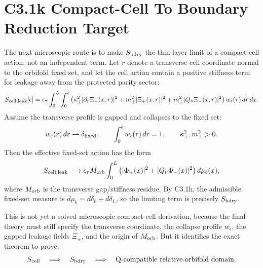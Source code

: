 \documentclass[11pt]{article}
\begin{document}
\section{C3.1k Compact-Cell To Boundary Reduction Target}
The next microscopic route is to make $S_{\rm bdry}$ the thin-layer limit of
a compact-cell action, not an independent term.  Let $r$ denote a transverse
cell coordinate normal to the orbifold fixed set, and let the cell action contain
a positive stiffness term for leakage away from the protected parity sector:
\begin{equation}
S_{\rm cell,leak}[\epsilon]
=
\epsilon_\tau
\int_0^L\int_0^\epsilon
\left(
\kappa_\perp^2|\partial_r\Xi_+(x,r)|^2
+m_\perp^2|\Xi_+(x,r)|^2
+m_\perp^2|Q_\nu\Xi_-(x,r)|^2
\right)
w_\epsilon(r)\,dr\,dx .
\end{equation}
Assume the transverse profile is gapped and collapses to the fixed set:
\begin{equation}
w_\epsilon(r)\,dr\rightharpoonup \delta_{\rm fixed},
\qquad
\int_0^\epsilon w_\epsilon(r)\,dr=1,
\qquad
\kappa_\perp^2,m_\perp^2>0 .
\end{equation}
Then the effective fixed-set action has the form
\begin{equation}
S_{\rm cell,leak}
\longrightarrow
\epsilon_\tau M_{\rm orb}
\int_0^L
\left(|\Phi_+(x)|^2+|Q_\nu\Phi_-(x)|^2\right)d\mu_b(x),
\end{equation}
where $M_{\rm orb}$ is the transverse gap/stiffness residue.  By C3.1h, the
admissible fixed-set measure is $d\mu_b=d\delta_0+d\delta_L$, so the limiting
term is precisely $S_{\rm bdry}$.

This is not yet a solved microscopic compact-cell derivation, because the final
theory must still specify the transverse coordinate, the collapse profile
$w_\epsilon$, the gapped leakage fields $\Xi_\pm$, and the origin of
$M_{\rm orb}$.  But it identifies the exact theorem to prove:
\begin{equation}
S_{\rm cell}
\quad\Longrightarrow\quad
S_{\rm bdry}
\quad\Longrightarrow\quad
\text{Q-compatible relative-orbifold domain} .
\end{equation}
\end{document}
